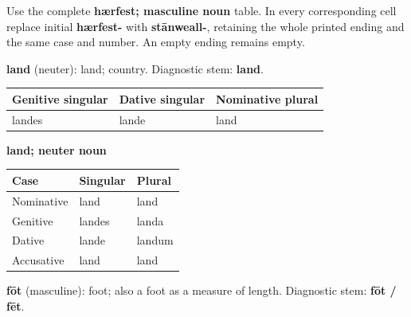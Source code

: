 Use the complete \textbf{hærfest; masculine noun} table. In every corresponding cell replace initial \textbf{hærfest-} with \textbf{stānweall-}, retaining the whole printed ending and the same case and number. An empty ending remains empty.

\textbf{land} (neuter): land; country. Diagnostic stem: \textbf{land}.

\par\begingroup
\fontsize{10.5}{13.2}\selectfont
\setlength{\LTleft}{0pt}\setlength{\LTright}{\fill}
\noindent
\begin{tabular}{@{}>{\raggedright\arraybackslash}p{39.24mm}>{\raggedright\arraybackslash}p{36.31mm}>{\raggedright\arraybackslash}p{42.82mm}@{}}
\toprule
\textbf{Genitive singular} & \textbf{Dative singular} & \textbf{Nominative plural} \\
\midrule
landes & lande & land \\
\bottomrule
\end{tabular}
\par\endgroup

\textbf{land; neuter noun}

\par\begingroup
\fontsize{10.5}{13.2}\selectfont
\setlength{\LTleft}{0pt}\setlength{\LTright}{\fill}
\noindent
\begin{tabular}{@{}>{\raggedright\arraybackslash}p{39.46mm}>{\raggedright\arraybackslash}p{39.46mm}>{\raggedright\arraybackslash}p{39.46mm}@{}}
\toprule
\textbf{Case} & \textbf{Singular} & \textbf{Plural} \\
\midrule
Nominative & land & land \\
Genitive & landes & landa \\
Dative & lande & landum \\
Accusative & land & land \\
\bottomrule
\end{tabular}
\par\endgroup

\textbf{fōt} (masculine): foot; also a foot as a measure of length. Diagnostic stem: \textbf{fōt /\allowbreak{} fēt}.

